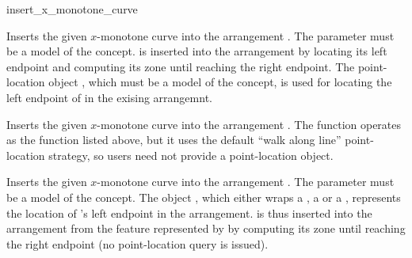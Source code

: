 
\ccRefPageBegin

\begin{ccRefFunction}{insert_x_monotone_curve}


   {Inserts the given $x$-monotone curve  into the arrangement
    . The  parameter must be a model of the
     concept.  is inserted
    into the arrangement by locating its left endpoint and computing its
    zone until reaching the right endpoint.
    The point-location object , which must be a model of the
     concept, is used for locating the
    left endpoint of  in the exising arrangemnt.
    }

   {Inserts the given $x$-monotone curve  into the arrangement
    . The function operates as the function listed above, but it
    uses the default ``walk along line'' point-location strategy, so users
    need not provide a point-location object.}

   {Inserts the given $x$-monotone curve  into the arrangement
    . The  parameter must be a model of the
     concept. The object , which
    either wraps a , a 
    or a , represents the location of 's left
    endpoint in the arrangement.  is thus inserted
    into the arrangement from the feature represented by  by
    computing its zone until reaching the right endpoint (no point-location
    query is issued).}

\end{ccRefFunction}

\ccRefPageEnd

